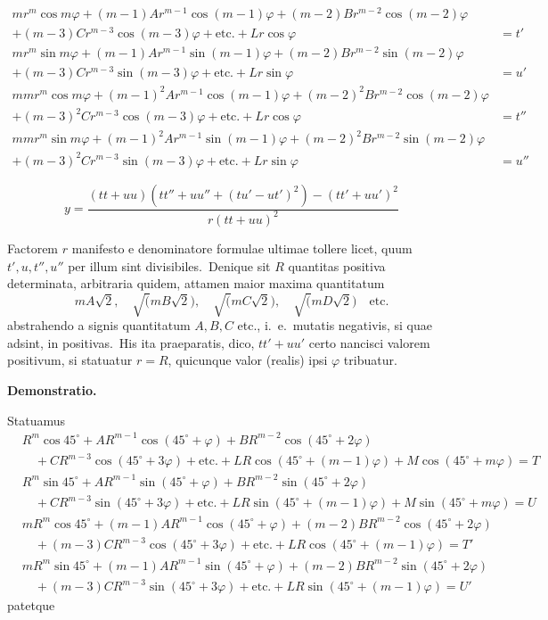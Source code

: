 \documentclass[12pt,a4paper]{article}
\theoremstyle{plain}
\begin{document}
\begin{align*}
mr^m \cos m\varphi + (m-1)Ar^{m-1} \cos(m-1)\varphi + (m-2)Br^{m-2} \cos(m-2)\varphi &\\
+ (m-3)Cr^{m-3} \cos(m-3)\varphi + \text{etc.} + Lr \cos\varphi &= t' \\
mr^m \sin m\varphi + (m-1)Ar^{m-1} \sin(m-1)\varphi + (m-2)Br^{m-2} \sin(m-2)\varphi &\\
+ (m-3)Cr^{m-3} \sin(m-3)\varphi + \text{etc.} + Lr \sin\varphi &= u' \\
mmr^m \cos m\varphi + (m-1)^2Ar^{m-1} \cos(m-1)\varphi + (m-2)^2Br^{m-2} \cos(m-2)\varphi &\\
+ (m-3)^2Cr^{m-3} \cos(m-3)\varphi + \text{etc.} + Lr \cos\varphi &= t'' \\
mmr^m \sin m\varphi + (m-1)^2Ar^{m-1} \sin(m-1)\varphi + (m-2)^2Br^{m-2} \sin(m-2)\varphi &\\
+ (m-3)^2Cr^{m-3} \sin(m-3)\varphi + \text{etc.} + Lr \sin\varphi &= u''
\end{align*}

\[
y = \frac{(tt+uu)(tt''+uu''+(tu'-ut')^2) - (tt'+uu')^2}{r(tt+uu)^2}
\]

Factorem $r$ manifesto e denominatore formulae ultimae tollere licet, quum
$t', u, t'', u''$ per illum sint divisibiles.\ Denique sit $R$ quantitas positiva determinata, arbitraria quidem, attamen maior maxima quantitatum
\[
mA\surd 2,\quad \surd(mB\surd 2),\quad \surd(mC\surd 2),\quad \surd(mD\surd 2) \quad \text{etc.}
\]
abstrahendo a signis quantitatum $A, B, C$ etc., i.\ e.\ mutatis negativis, si quae
adsint, in positivas.\ His ita praeparatis, dico, $tt' + uu'$ certo nancisci valorem
positivum, si statuatur $r = R$, quicunque valor (realis) ipsi $\varphi$ tribuatur.

\textbf{Demonstratio.}

Statuamus
\begin{align*}
&R^m \cos 45^\circ + AR^{m-1} \cos(45^\circ + \varphi) + BR^{m-2} \cos(45^\circ + 2\varphi) \\
&\quad + CR^{m-3} \cos(45^\circ + 3\varphi) + \text{etc.} + LR \cos(45^\circ + (m-1)\varphi) + M \cos(45^\circ + m\varphi) = T \\
&R^m \sin 45^\circ + AR^{m-1} \sin(45^\circ + \varphi) + BR^{m-2} \sin(45^\circ + 2\varphi) \\
&\quad + CR^{m-3} \sin(45^\circ + 3\varphi) + \text{etc.} + LR \sin(45^\circ + (m-1)\varphi) + M \sin(45^\circ + m\varphi) = U
\end{align*}
\begin{align*}
&mR^m \cos 45^\circ + (m-1)AR^{m-1} \cos(45^\circ + \varphi) + (m-2)BR^{m-2} \cos(45^\circ + 2\varphi) \\
&\quad + (m-3)CR^{m-3} \cos(45^\circ + 3\varphi) + \text{etc.} + LR \cos(45^\circ + (m-1)\varphi) = T' \\
&mR^m \sin 45^\circ + (m-1)AR^{m-1} \sin(45^\circ + \varphi) + (m-2)BR^{m-2} \sin(45^\circ + 2\varphi) \\
&\quad + (m-3)CR^{m-3} \sin(45^\circ + 3\varphi) + \text{etc.} + LR \sin(45^\circ + (m-1)\varphi) = U'
\end{align*}
patetque
\end{document}
